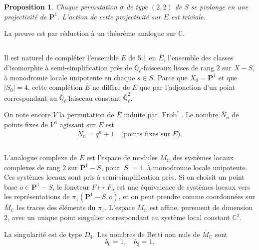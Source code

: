 \documentclass[11pt,a4paper]{article}
\theoremstyle{plain}
\newtheorem{proposition}[theorem]{Proposition}
\theoremstyle{definition}
\DeclareMathOperator{\Frob}{Frob}
\newcommand{\C}{\mathbb{C}}
\newcommand{\Ql}{\overline{\mathbb{Q}}_\ell}
\begin{document}
\begin{proposition}
Chaque permutation $\sigma$ de type $(2, 2)$ de $S$ se prolonge en une projectivit\'e de $\mathbf{P}^1$. L'action de cette projectivit\'e sur $E$ est triviale.
\end{proposition}

La preuve est par r\'eduction \`a un th\'eor\`eme analogue sur $\C$.

\subsection{}
Il est naturel de compl\'eter l'ensemble $E$ de 5.1 en $\overline{E}$, l'ensemble des classes d'isomorphie \`a semi-simplification pr\`es de $\Ql$-faisceaux lisses de rang $2$ sur $X - S$, \`a monodromie locale unipotente en chaque $s \in S$. Parce que $X_0 = \mathbf{P}^1$ et que $|S_0| = 4$, cette compl\'etion $\overline{E}$ ne diff\`ere de $E$ que par l'adjonction d'un point correspondant au $\Ql$-faisceau constant $\Ql^2$.

On note encore $V$ la permutation de $\overline{E}$ induite par $\Frob^*$. Le nombre $\overline{N}_n$ de points fixes de $V^n$ agissant sur $\overline{E}$ est
\begin{equation}
\overline{N}_n = q^n + 1 \quad \text{(points fixes sur } \overline{E}).
\tag{5.3.1}
\end{equation}

\subsection{}
L'analogue complexe de $\overline{E}$ est l'espace de modules $\overline{M}_\C$ des syst\`emes locaux complexes de rang $2$ sur $\mathbf{P}^1 - S$, pour $|S| = 4$, \`a monodromie locale unipotente. Ces syst\`emes locaux sont pris \`a semi-simplification pr\`es. Si on choisit un point base $o \in \mathbf{P}^1 - S$, le foncteur $F \mapsto F_o$ est une \'equivalence de syst\`emes locaux vers les repr\'esentations de $\pi_1(\mathbf{P}^1 - S, o)$, et on peut prendre comme coordonn\'ees sur $\overline{M}_\C$ les traces des \'el\'ements du $\pi_1$. L'espace $\overline{M}_\C$ est affine, purement de dimension $2$, avec un unique point singulier correspondant au syst\`eme local constant $\C^2$.

La singularit\'e est de type $D_4$. Les nombres de Betti non nuls de $\overline{M}_\C$ sont
\begin{equation}
b_0 = 1, \quad b_2 = 1.
\tag{5.4.1}
\end{equation}
\end{document}
